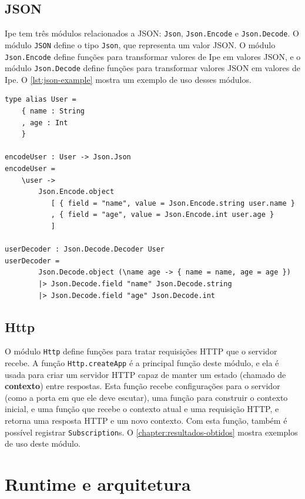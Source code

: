 \subsection{JSON}

Ipe tem três módulos relacionados a JSON: \texttt{Json}, \texttt{Json.Encode} e \texttt{Json.Decode}.
O módulo \texttt{JSON} define o tipo \texttt{Json}, que representa um valor JSON. O módulo \texttt{Json.Encode}
define funções para transformar valores de Ipe em valores JSON, e o módulo \texttt{Json.Decode} define
funções para transformar valores JSON em valores de Ipe. O \autoref{lst:json-example} mostra um exemplo
de uso desses módulos.

\begin{lstlisting}[label={lst:json-example},caption={Exemplo de uso dos módulos de JSON}]
type alias User =
    { name : String
    , age : Int
    }

encodeUser : User -> Json.Json
encodeUser =
    \user ->
        Json.Encode.object
           [ { field = "name", value = Json.Encode.string user.name }
           , { field = "age", value = Json.Encode.int user.age }
           ]

userDecoder : Json.Decode.Decoder User
userDecoder =
        Json.Decode.object (\name age -> { name = name, age = age })
        |> Json.Decode.field "name" Json.Decode.string
        |> Json.Decode.field "age" Json.Decode.int

\end{lstlisting}

\subsection{Http}\label{sec:lib-http}

O módulo \texttt{Http} define funções para tratar requisições HTTP que o servidor recebe. A função
\texttt{Http.createApp} é a principal função deste módulo, e ela é usada para criar um servidor HTTP
capaz de manter um estado (chamado de \textbf{contexto}) entre respostas. Esta função recebe
configurações para o servidor (como a porta em que ele deve escutar), uma função para construir o
contexto inicial, e uma função que recebe o contexto atual e uma requisição HTTP, e retorna uma
resposta HTTP e um novo contexto. Com esta função, também é possível registrar \texttt{Subscription}s.
O \autoref{chapter:resultados-obtidos} mostra exemplos de uso deste módulo.

\section{Runtime e arquitetura}\label{sec:runtime}

